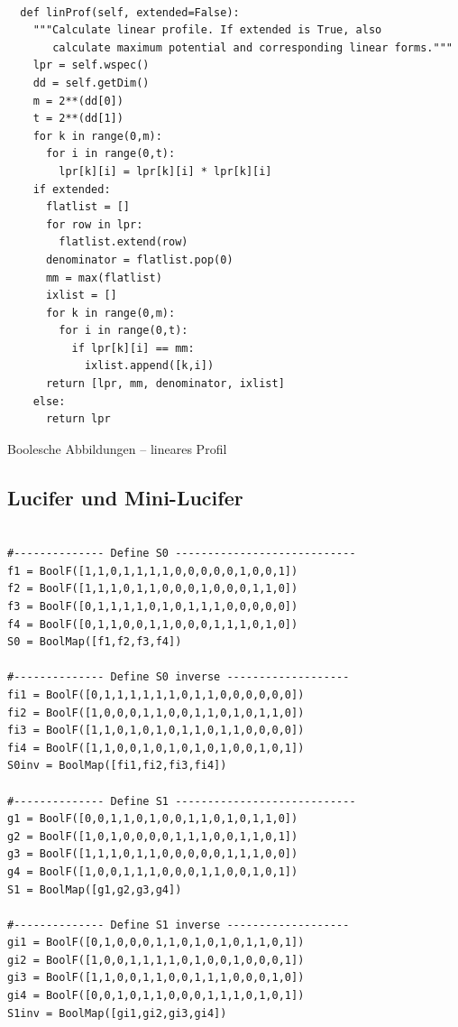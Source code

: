 \begin{refsegment}
\begin{sagecode}
\begin{verbatim}

  def linProf(self, extended=False):
    """Calculate linear profile. If extended is True, also
       calculate maximum potential and corresponding linear forms."""
    lpr = self.wspec()
    dd = self.getDim()
    m = 2**(dd[0])
    t = 2**(dd[1])
    for k in range(0,m):
      for i in range(0,t):
        lpr[k][i] = lpr[k][i] * lpr[k][i]
    if extended:
      flatlist = []
      for row in lpr:
        flatlist.extend(row)
      denominator = flatlist.pop(0)
      mm = max(flatlist)
      ixlist = []
      for k in range(0,m):
        for i in range(0,t):
          if lpr[k][i] == mm:
            ixlist.append([k,i])
      return [lpr, mm, denominator, ixlist]
    else:
      return lpr
\end{verbatim}
\caption{Boolesche Abbildungen -- lineares
   Profil}\label{Sage-code-bool-bool-map3}
\end{sagecode}
\clearpage

\subsection{Lucifer und Mini-Lucifer}\label{ss-bool-lucmin}

\begin{sagecode}
\begin{verbatim}

#-------------- Define S0 ----------------------------
f1 = BoolF([1,1,0,1,1,1,1,0,0,0,0,0,1,0,0,1])
f2 = BoolF([1,1,1,0,1,1,0,0,0,1,0,0,0,1,1,0])
f3 = BoolF([0,1,1,1,1,0,1,0,1,1,1,0,0,0,0,0])
f4 = BoolF([0,1,1,0,0,1,1,0,0,0,1,1,1,0,1,0])
S0 = BoolMap([f1,f2,f3,f4])

#-------------- Define S0 inverse -------------------
fi1 = BoolF([0,1,1,1,1,1,1,0,1,1,0,0,0,0,0,0])
fi2 = BoolF([1,0,0,0,1,1,0,0,1,1,0,1,0,1,1,0])
fi3 = BoolF([1,1,0,1,0,1,0,1,1,0,1,1,0,0,0,0])
fi4 = BoolF([1,1,0,0,1,0,1,0,1,0,1,0,0,1,0,1])
S0inv = BoolMap([fi1,fi2,fi3,fi4])

#-------------- Define S1 ----------------------------
g1 = BoolF([0,0,1,1,0,1,0,0,1,1,0,1,0,1,1,0])
g2 = BoolF([1,0,1,0,0,0,0,1,1,1,0,0,1,1,0,1])
g3 = BoolF([1,1,1,0,1,1,0,0,0,0,0,1,1,1,0,0])
g4 = BoolF([1,0,0,1,1,1,0,0,0,1,1,0,0,1,0,1])
S1 = BoolMap([g1,g2,g3,g4])

#-------------- Define S1 inverse -------------------
gi1 = BoolF([0,1,0,0,0,1,1,0,1,0,1,0,1,1,0,1])
gi2 = BoolF([1,0,0,1,1,1,1,0,1,0,0,1,0,0,0,1])
gi3 = BoolF([1,1,0,0,1,1,0,0,1,1,1,0,0,0,1,0])
gi4 = BoolF([0,0,1,0,1,1,0,0,0,1,1,1,0,1,0,1])
S1inv = BoolMap([gi1,gi2,gi3,gi4])


\end{verbatim}
\end{sagecode}
\end{refsegment}
